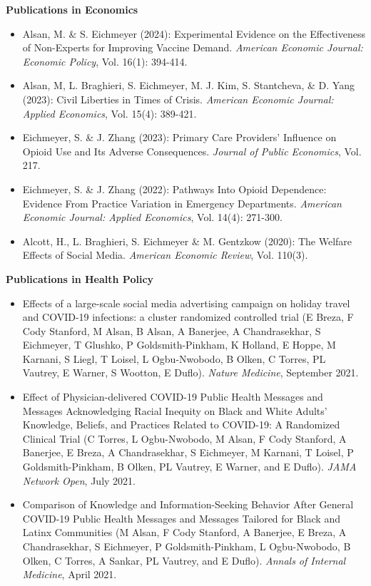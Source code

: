 \documentclass[letterpaper,11pt]{article}
\begin{document}
\begin{normalsize}
\textbf{Publications in Economics}
\setlength{\parindent}{0pt}
\setlength{\parskip}{0em}
\begin{itemize}[leftmargin=*]
\itemsep0em 
\item Alsan, M. \& S. Eichmeyer (2024): Experimental Evidence on the Effectiveness of Non-Experts for Improving Vaccine Demand. \textit{American Economic Journal: Economic Policy}, Vol. 16(1): 394-414.
\item Alsan, M, L. Braghieri, S. Eichmeyer, M. J. Kim, S. Stantcheva, \& D. Yang (2023): Civil Liberties in Times of Crisis. \textit{American Economic Journal: Applied Economics}, Vol. 15(4): 389-421.
\item Eichmeyer, S. \& J. Zhang (2023): Primary Care Providers’ Influence on Opioid Use and Its Adverse Consequences. \textit{Journal of Public Economics}, Vol. 217.
\item Eichmeyer, S. \& J. Zhang (2022): Pathways Into Opioid Dependence: Evidence From Practice Variation in Emergency Departments. \textit{American Economic Journal: Applied Economics}, Vol. 14(4): 271-300.
\item Alcott, H., L. Braghieri, S. Eichmeyer \& M. Gentzkow (2020): The Welfare Effects of Social Media. \textit{American Economic Review}, Vol. 110(3). 
\end{itemize}
\bigskip

\textbf{Publications in Health Policy} 
\begin{itemize}[leftmargin=*]
\itemsep0em 
\item Effects of a large-scale social media advertising campaign on holiday travel and COVID-19 infections: a cluster randomized controlled trial (E Breza, F Cody Stanford, M Alsan, B Alsan, A Banerjee, A Chandrasekhar, S Eichmeyer, T Glushko, P Goldsmith-Pinkham, K Holland, E Hoppe, M Karnani, S Liegl, T Loisel, L Ogbu-Nwobodo, B Olken, C Torres, PL Vautrey, E Warner, S Wootton, E Duflo).  \textit{Nature Medicine}, September 2021.
\item Effect of Physician-delivered COVID-19 Public Health Messages and Messages Acknowledging Racial Inequity on Black and White Adults' Knowledge, Beliefs, and Practices Related to COVID-19: A Randomized Clinical Trial (C Torres, L Ogbu-Nwobodo, M Alsan, F Cody Stanford, A Banerjee, E Breza, A Chandrasekhar, S Eichmeyer, M Karnani, T Loisel, P Goldsmith-Pinkham, B Olken, PL Vautrey, E Warner, and E Duflo).   \textit{JAMA Network Open}, July 2021. 
\item Comparison of Knowledge and Information-Seeking Behavior After General COVID-19 Public Health Messages and Messages Tailored for Black and Latinx Communities (M Alsan, F Cody Stanford, A Banerjee, E Breza, A Chandrasekhar, S Eichmeyer, P Goldsmith-Pinkham, L Ogbu-Nwobodo, B Olken, C Torres, A Sankar, PL Vautrey, and E Duflo).  \textit{Annals of Internal Medicine}, April 2021. 
\end{itemize}


\end{normalsize}
\end{document}
